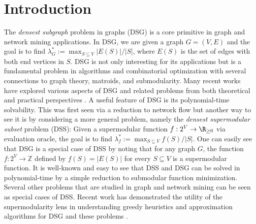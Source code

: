 \documentclass{article}
\newcommand{\dsg}{\textsc{DSG}\xspace}
\newcommand{\dss}{\textsc{DSS}\xspace}
\begin{document}
\section{Introduction}\label{sec:introduction}
\label{sec:intro}
The \emph{densest subgraph} problem in graphs (\dsg) is a core primitive in graph and network mining applications. In \dsg, we are given a graph $G=(V,E)$ and the goal is to find $\lambda_G^*:=\max_{S\subseteq V}|E(S)|/|S|$, where $E(S)$ is the set of edges with both end vertices in $S$. 
\dsg is not only interesting for its applications but is a fundamental problem in algorithms and combinatorial optimization with several connections to graph theory, matroids, and submodularity. Many recent works have explored various aspects of \dsg and related problems from both theoretical and practical perspectives \cite{densest-subgraph-survey,boob-20,sw-20,vbk-21,cqt-22,hqc-22,dhulipala2022differential,dinitz2023improved,adaptive-orientations,ne-24}. A useful feature of \dsg is its polynomial-time solvability. This was first seen via a reduction to network flow \cite{g-84,Picard-Queyranne} but another way to see it is by considering a more general problem, namely the \emph{densest supermodular subset} problem (\dss): Given a supermodular function $f:2^V\rightarrow \R_{\ge 0}$ via evaluation oracle, the goal is to find $\lambda^*_f:=\max_{S \subseteq V} {f(S)}/{|S|}$.
One can easily see that \dsg is a special case of \dss by noting that for any graph $G$, the function $f:2^V \rightarrow \mathbb{Z}$ defined by $f(S) = |E(S)|$ for every $S\subseteq V$ is a supermodular function. It is well-known and easy to see that \dss and \dsg can be solved in polynomial-time by a simple reduction to submodular function minimization. Several other problems that are studied in graph and network mining can be seen as special cases of \dss. Recent work has demonstrated the utility of the supermodularity lens in understanding greedy heuristics and approximation algorithms for \dsg and these problems \cite{cqt-22,vbk-21,hqc-22,hqc-23}.
\end{document}
